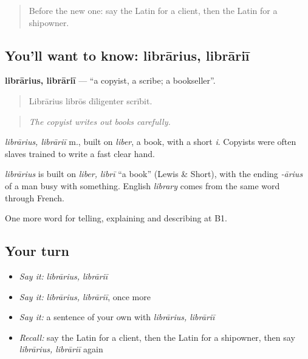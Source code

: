 \label{lesson:LA-C381-librarius}



\begin{quote}
Before the new one: say the Latin for a client, then the Latin for a shipowner.
\end{quote}

\subsection*{You'll want to know: librārius, librāriī}
\textbf{librārius, librāriī} — \textquotedblleft{}a copyist, a scribe; a bookseller\textquotedblright{}.

\begin{quote}
Librārius librōs dīligenter scrībit.
\end{quote}

\begin{quote}
\emph{The copyist writes out books carefully.}
\end{quote}

\emph{librārius, librāriī} m., built on \emph{liber}, a book, with a short \emph{i}. Copyists were often slaves trained to write a fast clear hand.

\begin{cousinweb}
\emph{librārius} is built on \emph{liber, librī} \textquotedblleft{}a book\textquotedblright{} (Lewis \& Short), with the ending \emph{-ārius} of a man busy with something. English \emph{library} comes from the same word through French.
\end{cousinweb}

\begin{grammarlens}[title={What you've built}]
One more word for telling, explaining and describing at B1.
\end{grammarlens}

\subsection*{Your turn}
\begin{itemize}
\raggedright
  \item \emph{Say it:} \emph{librārius, librāriī}
  \item \emph{Say it:} \emph{librārius, librāriī}, once more
  \item \emph{Say it:} a sentence of your own with \emph{librārius, librāriī}
  \item \emph{Recall:} say the Latin for a client, then the Latin for a shipowner, then say \emph{librārius, librāriī} again
\end{itemize}

